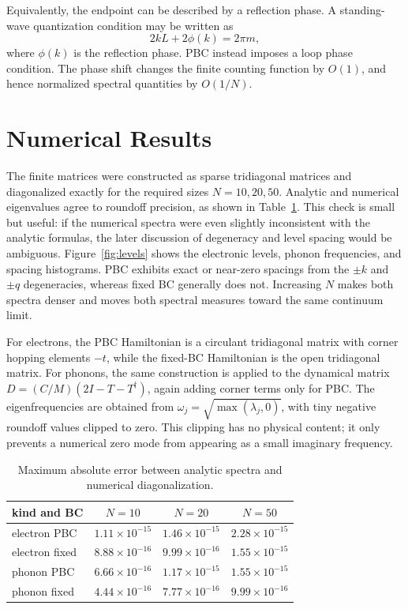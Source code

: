 ﻿\documentclass[a4paper,aps,prb,reprint,floatfix,nofootinbib,longbibliography]{revtex4-2}
\begin{document}
Equivalently, the endpoint can be described by a reflection phase.  A standing-wave quantization condition may be written as
\begin{equation}
2kL+2\phi(k)=2\pi m,
\end{equation}
where \(\phi(k)\) is the reflection phase.  PBC instead imposes a loop phase condition.  The phase shift changes the finite counting function by \(O(1)\), and hence normalized spectral quantities by \(O(1/N)\).

\section{Numerical Results}

The finite matrices were constructed as sparse tridiagonal matrices and diagonalized exactly for the required sizes \(N=10,20,50\).  Analytic and numerical eigenvalues agree to roundoff precision, as shown in Table~\ref{tab:eigerr}.  This check is small but useful: if the numerical spectra were even slightly inconsistent with the analytic formulas, the later discussion of degeneracy and level spacing would be ambiguous.  Figure~\ref{fig:levels} shows the electronic levels, phonon frequencies, and spacing histograms.  PBC exhibits exact or near-zero spacings from the \(\pm k\) and \(\pm q\) degeneracies, whereas fixed BC generally does not.  Increasing \(N\) makes both spectra denser and moves both spectral measures toward the same continuum limit.

For electrons, the PBC Hamiltonian is a circulant tridiagonal matrix with corner hopping elements \(-t\), while the fixed-BC Hamiltonian is the open tridiagonal matrix.  For phonons, the same construction is applied to the dynamical matrix \(D=(C/M)(2I-T-T^\dagger)\), again adding corner terms only for PBC.  The eigenfrequencies are obtained from \(\omega_j=\sqrt{\max(\lambda_j,0)}\), with tiny negative roundoff values clipped to zero.  This clipping has no physical content; it only prevents a numerical zero mode from appearing as a small imaginary frequency.

\begin{table}[b]
\caption{\label{tab:eigerr}\small Maximum absolute error between analytic spectra and numerical diagonalization.}
\begin{ruledtabular}
\begin{tabular}{lccc}
kind and BC & \(N=10\) & \(N=20\) & \(N=50\)\\
\hline
electron PBC & \(1.11{\times}10^{-15}\) & \(1.46{\times}10^{-15}\) & \(2.28{\times}10^{-15}\)\\
electron fixed & \(8.88{\times}10^{-16}\) & \(9.99{\times}10^{-16}\) & \(1.55{\times}10^{-15}\)\\
phonon PBC & \(6.66{\times}10^{-16}\) & \(1.17{\times}10^{-15}\) & \(1.55{\times}10^{-15}\)\\
phonon fixed & \(4.44{\times}10^{-16}\) & \(7.77{\times}10^{-16}\) & \(9.99{\times}10^{-16}\)
\end{tabular}
\end{ruledtabular}
\end{table}
\end{document}
